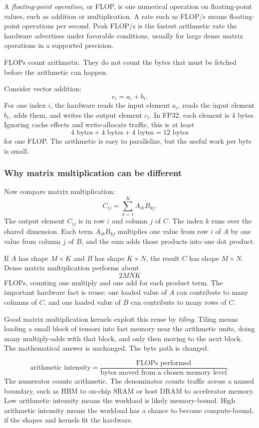 A \emph{floating-point operation}, or FLOP, is one numerical operation on floating-point values, such as addition or multiplication. A rate such as FLOP/s means floating-point operations per second. Peak FLOP/s is the fastest arithmetic rate the hardware advertises under favorable conditions, usually for large dense matrix operations in a supported precision.

FLOPs count arithmetic. They do not count the bytes that must be fetched before the arithmetic can happen.

Consider vector addition:
\[
  c_i = a_i + b_i.
\]
For one index \(i\), the hardware reads the input element \(a_i\), reads the input element \(b_i\), adds them, and writes the output element \(c_i\). In FP32, each element is 4 bytes. Ignoring cache effects and write-allocate traffic, this is at least
\[
  4 \text{ bytes} + 4 \text{ bytes} + 4 \text{ bytes}
  = 12 \text{ bytes}
\]
for one FLOP. The arithmetic is easy to parallelize, but the useful work per byte is small.

\subsubsection{Why matrix multiplication can be different}

Now compare matrix multiplication:
\[
  C_{ij} = \sum_{k=1}^{K} A_{ik} B_{kj}.
\]
The output element \(C_{ij}\) is in row \(i\) and column \(j\) of \(C\). The index \(k\) runs over the shared dimension. Each term \(A_{ik}B_{kj}\) multiplies one value from row \(i\) of \(A\) by one value from column \(j\) of \(B\), and the sum adds those products into one dot product.

If \(A\) has shape \(M \times K\) and \(B\) has shape \(K \times N\), the result \(C\) has shape \(M \times N\). Dense matrix multiplication performs about
\[
  2M N K
\]
FLOPs, counting one multiply and one add for each product term. The important hardware fact is reuse: one loaded value of \(A\) can contribute to many columns of \(C\), and one loaded value of \(B\) can contribute to many rows of \(C\).

Good matrix multiplication kernels exploit this reuse by \emph{tiling}. Tiling means loading a small block of tensors into fast memory near the arithmetic units, doing many multiply-adds with that block, and only then moving to the next block. The mathematical answer is unchanged. The byte path is changed.

\begin{keyequation}
\[
  \text{arithmetic intensity} =
  \frac{\text{FLOPs performed}}{\text{bytes moved from a chosen memory level}}.
\]
\tcblower
The numerator counts arithmetic. The denominator counts traffic across a named boundary, such as HBM to on-chip SRAM or host DRAM to accelerator memory. Low arithmetic intensity means the workload is likely memory-bound. High arithmetic intensity means the workload has a chance to become compute-bound, if the shapes and kernels fit the hardware.
\end{keyequation}


